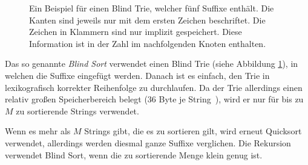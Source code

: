 \begin{figure}[!h]
\centering
\newcommand{\tnode}{\node[draw,circle]}
\newcommand{\trans}{\draw[-stealth]}
\caption[Beispiel für einen Blind Trie]{Ein Beispiel für einen Blind Trie, welcher fünf Suffixe enthält. Die Kanten sind jeweils nur mit dem ersten Zeichen beschriftet. Die Zeichen in Klammern sind nur implizit gespeichert. Diese Information ist in der Zahl im nachfolgenden Knoten enthalten.}
\label{fg:blindtrie}
\end{figure}

Das so genannte \textit{Blind Sort} verwendet einen Blind Trie (siehe Abbildung \ref{fg:blindtrie}),
in welchen die Suffixe eingefügt werden.
Danach ist es einfach, den Trie in lexikografisch korrekter Reihenfolge zu durchlaufen.
Da der Trie allerdings einen relativ großen Speicherbereich belegt (36 Byte je String~\cite{saca:4}),
wird er nur für bis zu $M$ zu sortierende Strings verwendet.

Wenn es mehr als $M$ Strings gibt, die es zu sortieren gilt, wird erneut Quicksort~\cite{ternary_quicksort} verwendet, allerdings werden diesmal ganze Suffixe verglichen.
Die Rekursion verwendet Blind Sort, wenn die zu sortierende Menge klein genug ist.

